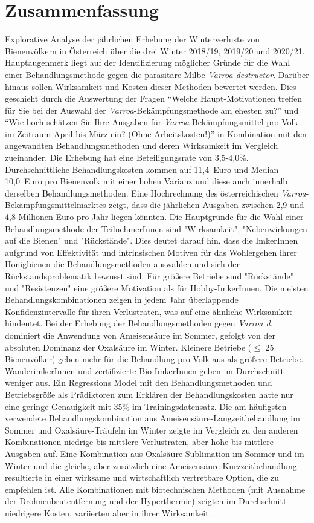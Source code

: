 \chapter*{Zusammenfassung}
\label{sec:Zusammenfassung}
\vspace*{-15mm}

Explorative Analyse der jährlichen Erhebung der Winterverluste von Bienenvölkern in Österreich über die drei Winter 2018/19, 2019/20 und 2020/21. Hauptaugenmerk liegt auf der Identifizierung möglicher Gründe für die Wahl einer Behandlungsmethode gegen die parasitäre Milbe \textit{Varroa destructor}. Darüber hinaus sollen Wirksamkeit und Kosten dieser Methoden bewertet werden. Dies geschieht durch die Auswertung der Fragen \enquote{Welche Haupt-Motivationen treffen für Sie bei der Auswahl der \textit{Varroa}-Bekämpfungsmethode am ehesten zu?} und \enquote{Wie hoch schätzen Sie Ihre Ausgaben für \textit{Varroa}-Bekämpfungsmittel pro Volk im Zeitraum April bis März ein? (Ohne Arbeitskosten!)} in Kombination mit den angewandten Behandlungsmethoden und deren Wirksamkeit im Vergleich zueinander. Die Erhebung hat eine Beteiligungsrate von 3,5-4,0\%. Durchschnittliche Behandlungskosten kommen auf 11,4~Euro und Median 10,0~Euro pro Bienenvolk mit einer hohen Varianz und diese auch innerhalb derselben Behandlungsmethoden. Eine Hochrechnung des österreichischen \textit{Varroa}-Bekämpfungsmittelmarktes zeigt, dass die jährlichen Ausgaben zwischen 2,9 und 4,8 Millionen Euro pro Jahr liegen könnten. Die Hauptgründe für die Wahl einer Behandlungsmethode der TeilnehmerInnen sind "Wirksamkeit", "Nebenwirkungen auf die Bienen" und "Rückstände". Dies deutet darauf hin, dass die ImkerInnen aufgrund von Effektivität und intrinsischen Motiven für das Wohlergehen ihrer Honigbienen die Behandlungsmethoden auswählen und sich der Rückstandsproblematik bewusst sind. Für größere Betriebe sind "Rückstände" und "Resistenzen" eine größere Motivation als für Hobby-ImkerInnen. Die meisten Behandlungskombinationen zeigen in jedem Jahr überlappende Konfidenzintervalle für ihren Verlustraten, was auf eine ähnliche Wirksamkeit hindeutet. Bei der Erhebung der Behandlungsmethoden gegen \textit{Varroa d.} dominiert die Anwendung von Ameisensäure im Sommer, gefolgt von der absoluten Dominanz der Oxalsäure im Winter. Kleinere Betriebe ($\leq$ 25 Bienenvölker) geben mehr für die Behandlung pro Volk aus als größere Betriebe. WanderimkerInnen und zertifizierte Bio-ImkerInnen geben im Durchschnitt weniger aus. Ein Regressions Model mit den Behandlungsmethoden und Betriebsgröße als Prädiktoren zum Erklären der Behandlungskosten hatte nur eine geringe Genauigkeit mit 35\% im Trainingsdatensatz. Die am häufigsten verwendete Behandlungskombination aus Ameisensäure-Langzeitbehandlung im Sommer und Oxalsäure-Träufeln im Winter zeigte im Vergleich zu den anderen Kombinationen niedrige bis mittlere Verlustraten, aber hohe bis mittlere Ausgaben auf. Eine Kombination aus Oxalsäure-Sublimation im Sommer und im Winter und die gleiche, aber zusätzlich eine Ameisensäure-Kurzzeitbehandlung resultierte in einer wirksame und wirtschaftlich vertretbare Option, die zu empfehlen ist. Alle Kombinationen mit biotechnischen Methoden (mit Ausnahme der Drohnenbrutentfernung und der Hyperthermie) zeigten im Durchschnitt niedrigere Kosten, variierten aber in ihrer Wirksamkeit.
